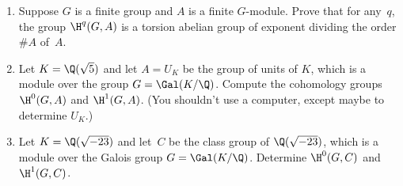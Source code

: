 \begin{enumerate}






\item Suppose $G$ is a finite group and $A$ is a finite $G$-module.
  Prove that for any~$q$, the group $\H^q(G,A)$ is a torsion abelian group of
  exponent dividing the order $\#A$ of~$A$.

\item Let $K=\Q(\sqrt{5})$ and let $A=U_K$ be the group of units of
  $K$, which is a module over the group $G=\Gal(K/\Q)$.  Compute the
  cohomology groups $\H^0(G,A)$ and $\H^1(G,A)$.  (You shouldn't use
  a computer, except maybe to determine $U_K$.)

\item Let $K=\Q(\sqrt{-23})$ and let~$C$ be the class group of
$\Q(\sqrt{-23})$, which is a module over the Galois group $G=\Gal(K/\Q)$. 
Determine $\H^0(G,C)$ and $\H^1(G,C)$.  


\end{enumerate}

